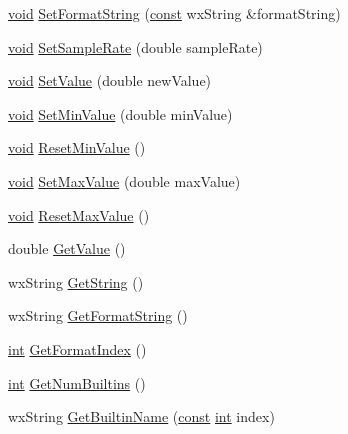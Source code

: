 \begin{DoxyCompactItemize}
\hyperlink{sound_8c_ae35f5844602719cf66324f4de2a658b3}{void} \hyperlink{class_numeric_converter_a9d7d92c109110f2f1108ea11e13af7f9}{Set\+Format\+String} (\hyperlink{getopt1_8c_a2c212835823e3c54a8ab6d95c652660e}{const} wx\+String \&format\+String)
\item 
\hyperlink{sound_8c_ae35f5844602719cf66324f4de2a658b3}{void} \hyperlink{class_numeric_converter_a454236d81c446e6a1445322b38a25293}{Set\+Sample\+Rate} (double sample\+Rate)
\item 
\hyperlink{sound_8c_ae35f5844602719cf66324f4de2a658b3}{void} \hyperlink{class_numeric_converter_a6d148c647d98a466abf85f80909cec65}{Set\+Value} (double new\+Value)
\item 
\hyperlink{sound_8c_ae35f5844602719cf66324f4de2a658b3}{void} \hyperlink{class_numeric_converter_a59178562480eab298be41743b04817dc}{Set\+Min\+Value} (double min\+Value)
\item 
\hyperlink{sound_8c_ae35f5844602719cf66324f4de2a658b3}{void} \hyperlink{class_numeric_converter_abe4cc2e3e8cd6291a907ac7c2a0cf385}{Reset\+Min\+Value} ()
\item 
\hyperlink{sound_8c_ae35f5844602719cf66324f4de2a658b3}{void} \hyperlink{class_numeric_converter_ab65ece7d2454d1bee91a9c2cc57f4582}{Set\+Max\+Value} (double max\+Value)
\item 
\hyperlink{sound_8c_ae35f5844602719cf66324f4de2a658b3}{void} \hyperlink{class_numeric_converter_ace85cbe076b56f905b56ac7e6008b15f}{Reset\+Max\+Value} ()
\item 
double \hyperlink{class_numeric_converter_ab77d6ab7bae881f93f0686424871841f}{Get\+Value} ()
\item 
wx\+String \hyperlink{class_numeric_converter_a5464b6d22c5b321fcb3970edb6e19c7a}{Get\+String} ()
\item 
wx\+String \hyperlink{class_numeric_converter_a0ed2cb4119f6ac333efe991f01f21b5d}{Get\+Format\+String} ()
\item 
\hyperlink{xmltok_8h_a5a0d4a5641ce434f1d23533f2b2e6653}{int} \hyperlink{class_numeric_converter_a68b2bfacedfc3a5255632a3ad60f0611}{Get\+Format\+Index} ()
\item 
\hyperlink{xmltok_8h_a5a0d4a5641ce434f1d23533f2b2e6653}{int} \hyperlink{class_numeric_converter_a284c1feca5ff798483f67253c10f4e68}{Get\+Num\+Builtins} ()
\item 
wx\+String \hyperlink{class_numeric_converter_a60aebf908f946fd922b74174a9beabf6}{Get\+Builtin\+Name} (\hyperlink{getopt1_8c_a2c212835823e3c54a8ab6d95c652660e}{const} \hyperlink{xmltok_8h_a5a0d4a5641ce434f1d23533f2b2e6653}{int} index)

\end{DoxyCompactItemize}

